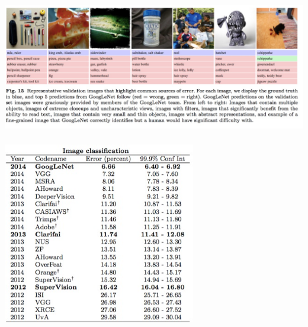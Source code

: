 \documentclass[xetex,mathserif,serif,aspectratio=169]{beamer}
\begin{document}
\begin{frame}[fragile] \frametitle{} \oldB \small

\begin{center}
\includegraphics[width=\textwidth]{img/ilsvrcCommonErrors.jpg}
\end{center}

\end{frame}


\begin{frame}[fragile] \frametitle{} \oldB \small

\begin{center}
\includegraphics[width=0.63\textwidth]{img/ilsvrcClassRates.jpg}
\end{center}

\end{frame}
\end{document}
